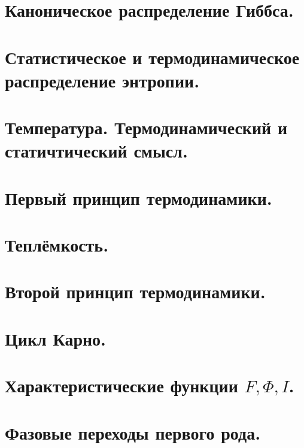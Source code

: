 \newcommand{\colontitulAutors}{edombek}
\newcommand{\colontitulYear}{2022}
\newcommand{\colontitulEducationalSubject}{Термодинамика и статистическая физика}
\newcommand{\colontitulTeacher}{Гавриленко В.Г.}




	\small
	\begin{multicols*}{2}
		\section{Каноническое распределение Гиббса.}
		
		\section{Статистическое и термодинамическое распределение энтропии.}
		
		\section{Температура. Термодинамический и статичтический смысл.}
		
		\section{Первый принцип термодинамики.}
		
		\section{Теплёмкость.}
		
		\section{Второй принцип термодинамики.}
		
		\section{Цикл Карно.}
		
		\section{Характеристические функции $F, \Phi, I$.}
		
		\section{Фазовые переходы первого рода.}
		

\end{multicols*}
